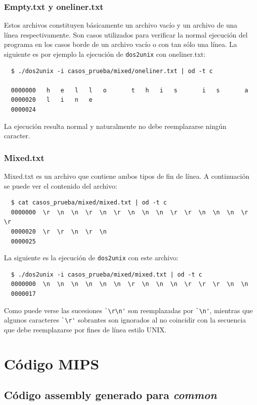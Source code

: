 \documentclass[a4paper,10pt, spanish]{article}
\begin{document}
\subsubsection{Empty.txt y oneliner.txt}
Estos archivos constituyen básicamente un archivo vacío y un archivo de una línea respectivamente.
Son casos utilizados para verificar la normal ejecución del programa en los casos borde de un archivo
vacío o con tan sólo una línea.
La siguiente es por ejemplo la ejecución de \lstinline{dos2unix} con oneliner.txt:
\begin{lstlisting}
  $ ./dos2unix -i casos_prueba/mixed/oneliner.txt | od -t c
  
  0000000   h   e   l   l   o       t   h   i   s       i   s       a    
  0000020   l   i   n   e
  0000024    
\end{lstlisting}
La ejecución resulta normal y naturalmente no debe reemplazarse ningún caracter.
\subsubsection{Mixed.txt}
Mixed.txt es un archivo que contiene ambos tipos de fin de línea.
A continuación se puede ver el contenido del archivo:
\begin{lstlisting}
  $ cat casos_prueba/mixed/mixed.txt | od -t c
  0000000  \r  \n  \n  \r  \n  \r  \n  \n  \n  \r  \r  \n  \n  \n  \r  \r
  0000020  \r  \r  \n  \r  \n
  0000025
\end{lstlisting}
La siguiente es la ejecución de \lstinline{dos2unix} con este archivo:
\begin{lstlisting}
  $ ./dos2unix -i casos_prueba/mixed/mixed.txt | od -t c
  0000000  \n  \n  \n  \n  \n  \n  \r  \n  \n  \n  \r  \r  \r  \n  \n
  0000017  
\end{lstlisting}
Como puede verse las sucesiones \lstinline{`\r\n'} son reemplazadas por \lstinline{`\n'},
mientras que algunos caracteres \lstinline{`\r'} sobrantes son ignorados al no coincidir
con la secuencia que debe reemplazarse por fines de línea estilo UNIX.


\section{Código MIPS}

\subsection{Código assembly generado para \textit{common}}
\end{document}
